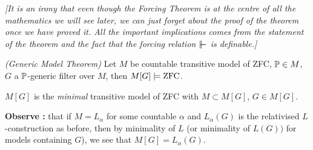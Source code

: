 \documentclass[12pt,a4paper]{article}
\begin{document}
\emph{[It is an irony that even though the Forcing Theorem is at the centre of all the mathematics we will see later, we can just forget about the proof of the theorem once we have proved it. All the important implications comes from the statement of the theorem and the fact that the forcing relation $\forces$ is definable.]}
\s

\thm \emph{(Generic Model Theorem)} Let $M$ be countable transitive model of ZFC, $\mathbb{P} \in M$, $G$ a $\mathbb{P}$-generic filter over $M$, then $M[G] \models \text{ZFC}$.
\s

\corr $M[G]$ is the \emph{minimal} transitive model of ZFC with $M\subset M[G]$, $G\in M[G]$.
\s

\textbf{Observe :} that if $M = L_{\alpha}$  for some countable $\alpha$ and $L_{\alpha}(G)$ is the relativised $L$-construction as before, then by minimality of $L$ (or minimality of $L(G))$ for models containing $G$), we see that $M[G] = L_{\alpha}(G)$. 
\s
\end{document}
